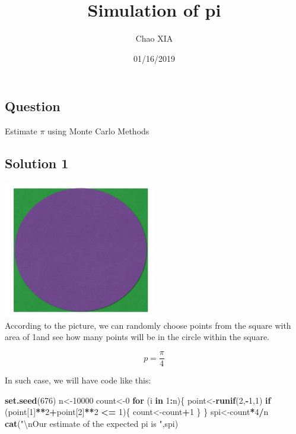 \documentclass[]{article}
\title{Simulation of pi}
\author{Chao XIA}
\date{01/16/2019}
\newenvironment{Shaded}{\begin{snugshade}}{\end{snugshade}}
\newcommand{\KeywordTok}[1]{\textcolor[rgb]{0.13,0.29,0.53}{\textbf{#1}}}
\newcommand{\DecValTok}[1]{\textcolor[rgb]{0.00,0.00,0.81}{#1}}
\newcommand{\CharTok}[1]{\textcolor[rgb]{0.31,0.60,0.02}{#1}}
\newcommand{\StringTok}[1]{\textcolor[rgb]{0.31,0.60,0.02}{#1}}
\newcommand{\ControlFlowTok}[1]{\textcolor[rgb]{0.13,0.29,0.53}{\textbf{#1}}}
\newcommand{\OperatorTok}[1]{\textcolor[rgb]{0.81,0.36,0.00}{\textbf{#1}}}
\newcommand{\NormalTok}[1]{#1}
\begin{document}
\maketitle

\subsection{Question}\label{question}

Estimate \(\pi\) using Monte Carlo Methods

\subsection{Solution 1}\label{solution-1}

\includegraphics[width=0.50000\textwidth]{solution 1.jpg}\\
According to the picture, we can randomly choose points from the square
with area of 1and see how many points will be in the circle within the
square.

\[p = \frac{\pi}{4}\]

In such case, we will have code like this:

\begin{Shaded}
\begin{Highlighting}[]
\KeywordTok{set.seed}\NormalTok{(}\DecValTok{676}\NormalTok{)}
\NormalTok{n<-}\DecValTok{10000}
\NormalTok{count<-}\DecValTok{0}
\ControlFlowTok{for}\NormalTok{ (i }\ControlFlowTok{in} \DecValTok{1}\OperatorTok{:}\NormalTok{n)\{}
\NormalTok{  point<-}\KeywordTok{runif}\NormalTok{(}\DecValTok{2}\NormalTok{,}\OperatorTok{-}\DecValTok{1}\NormalTok{,}\DecValTok{1}\NormalTok{)}
  \ControlFlowTok{if}\NormalTok{ (point[}\DecValTok{1}\NormalTok{]}\OperatorTok{**}\DecValTok{2}\OperatorTok{+}\NormalTok{point[}\DecValTok{2}\NormalTok{]}\OperatorTok{**}\DecValTok{2} \OperatorTok{<=}\StringTok{ }\DecValTok{1}\NormalTok{)\{}
\NormalTok{    count<-count}\OperatorTok{+}\DecValTok{1}
\NormalTok{  \}}
\NormalTok{\}}
\NormalTok{spi<-count}\OperatorTok{*}\DecValTok{4}\OperatorTok{/}\NormalTok{n}
\KeywordTok{cat}\NormalTok{(}\StringTok{"}\CharTok{\textbackslash{}n}\StringTok{Our estimate of the expected pi is "}\NormalTok{,spi)}
\end{Highlighting}
\end{Shaded}
\end{document}
